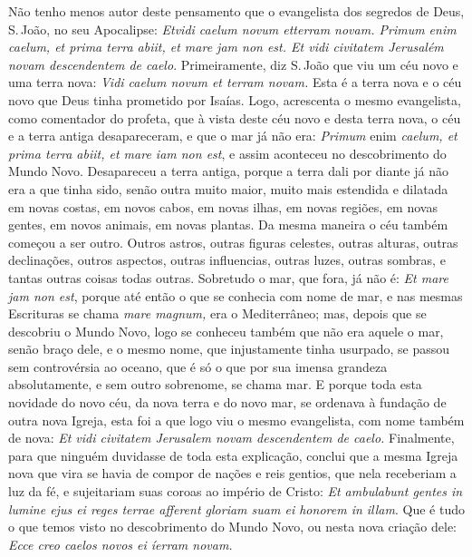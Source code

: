 Não tenho menos autor deste pensamento que o evangelista dos segredos de
Deus, S.\,João, no seu Apocalipse: \emph{Etvidi caelum novum etterram
novam. Primum enim caelum, et prima terra abiit, et mare jam non est. Et
vidi civitatem Jerusalém novam descendentem de caelo}.
Primeiramente, diz S.\,João que viu um céu novo e uma terra
nova: \emph{Vidi caelum novum et terram novam.} Esta é a terra nova e o
céu novo que Deus tinha prometido por Isaías. Logo, acrescenta o mesmo
evangelista, como comentador do profeta, que à vista deste céu novo e
desta terra nova, o céu e a terra antiga desapareceram, e que o mar já
não era: \emph{Primum} enim \emph{caelum, et prima terra abiit, et mare
iam non est}, e assim aconteceu no descobrimento do Mundo Novo.
Desapareceu a terra antiga, porque a terra dali por diante já não era a
que tinha sido, senão outra muito maior, muito mais estendida e dilatada
em novas costas, em novos cabos, em novas ilhas, em novas regiões, em
novas gentes, em novos animais, em novas plantas. Da mesma maneira o céu
também começou a ser outro. Outros astros, outras figuras celestes,
outras alturas, outras declinações, outros aspectos, outras influencias,
outras luzes, outras sombras, e tantas outras coisas todas outras.
Sobretudo o mar, que fora, já não é: \emph{Et mare jam non est},
porque até então o que se conhecia com nome de mar, e nas mesmas
Escrituras se chama \emph{mare magnum,} era o Mediterrâneo; mas, depois
que se descobriu o Mundo Novo, logo se conheceu também que não era
aquele o mar, senão braço dele, e o mesmo nome, que injustamente tinha
usurpado, se passou sem controvérsia ao oceano, que é só o que por sua
imensa grandeza absolutamente, e sem outro sobrenome, se chama mar. E
porque toda esta novidade do novo céu, da nova terra e do novo mar, se
ordenava à fundação de outra nova Igreja, esta foi a que logo viu o
mesmo evangelista, com nome também de nova: \emph{Et vidi civitatem
Jerusalem novam descendentem de caelo.} Finalmente, para que ninguém
duvidasse de toda esta explicação, conclui que a mesma Igreja nova que
vira se havia de compor de nações e reis gentios, que nela receberiam a
luz da fé, e sujeitariam suas coroas ao império de Cristo: \emph{Et
ambulabunt gentes in lumine ejus ei reges terrae afferent gloriam suam
ei honorem in illam}. Que é tudo o que temos visto
no descobrimento do Mundo Novo, ou nesta nova criação dele: \emph{Ecce
creo caelos novos ei íerram novam.}

